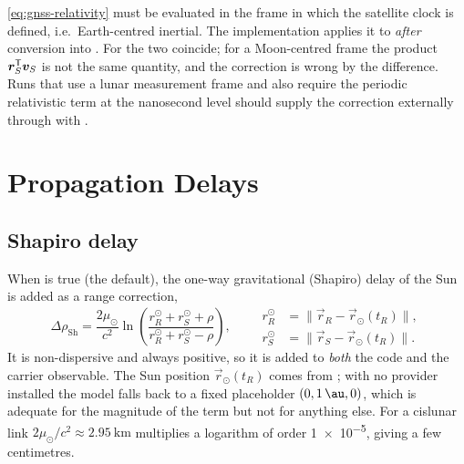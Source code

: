 \begin{lupntwarning}
  \cref{eq:gnss-relativity} must be evaluated in the frame in which the
  satellite clock is defined, i.e.\ Earth-centred inertial. The
  implementation applies it to  \emph{after} conversion into
  . For  the two coincide; for a
  Moon-centred frame the product $\bm{r}_S^{\mathsf{T}}\bm{v}_S$ is not the
  same quantity, and the correction is wrong by the difference. Runs that use
  a lunar measurement frame and also require the periodic relativistic term at
  the nanosecond level should supply the correction externally through
   with
  .
\end{lupntwarning}

\section{Propagation Delays}
\label{sec:gnss-propagation}

\subsection{Shapiro delay}
\label{sec:gnss-shapiro}

When  is true (the default), the one-way
gravitational (Shapiro) delay of the Sun is added as a range correction,
\begin{equation}
  \label{eq:gnss-shapiro}
  \Delta\rho_{\mathrm{Sh}}
  = \frac{2\mu_\odot}{c^{2}}
    \ln\!\left(
      \frac{r_R^{\odot} + r_S^{\odot} + \rho}
           {r_R^{\odot} + r_S^{\odot} - \rho}
    \right),
  \qquad
  \begin{aligned}
    r_R^{\odot} &= \lVert \vec{r}_R - \vec{r}_\odot(t_R) \rVert, \\
    r_S^{\odot} &= \lVert \vec{r}_S - \vec{r}_\odot(t_R) \rVert .
  \end{aligned}
\end{equation}
It is non-dispersive and always positive, so it is added to \emph{both} the
code and the carrier observable. The Sun position $\vec{r}_\odot(t_R)$ comes
from ; with no provider installed the model falls
back to a fixed placeholder $(0, \SI{1}{\au}, 0)$, which is adequate for the
magnitude of the term but not for anything else. For a cislunar link
$2\mu_\odot/c^2 \approx \SI{2.95}{\kilo\meter}$ multiplies a logarithm of
order \num{1e-5}, giving a few centimetres.

